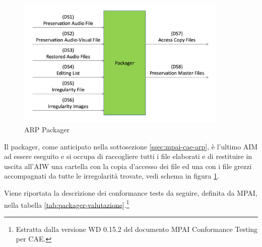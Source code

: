 \begin{figure}[h]
    \centering
    \includegraphics[width=0.9\textwidth]{img/packager.png}
    \caption{\ac{ARP} Packager}
    \label{fig:packager}
\end{figure}


Il packager, come anticipato nella sottosezione \ref{ssec:mpai-cae-arp}, è l'ultimo \ac{AIM} ad essere eseguito e si occupa di raccogliere tutti i file elaborati e di restituire in uscita all'\ac{AIW} una cartella con la copia d'accesso dei file ed una con i file grezzi accompagnati da tutte le irregolarità trovate, vedi schema in figura \ref{fig:packager}.

Viene riportata la descrizione dei conformance tests da seguire, definita da MPAI, nella tabella \ref{tab:packager-valutazione}.\footnote{Estratta dalla versione WD 0.15.2 del documento MPAI Conformance Testing per \ac{CAE}.} 


